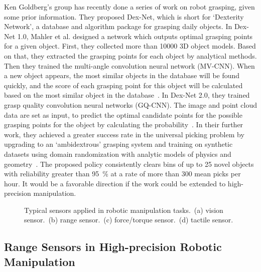 \documentclass[journal,twoside,web]{ieeecolor}
\begin{document}
Ken Goldberg's group has recently done a series of work on robot grasping, given some prior information. 
They proposed Dex-Net, which is short for `Dexterity Network', a database and algorithm package for grasping daily objects.
In Dex-Net 1.0, Mahler et al. designed a network which outputs optimal grasping points for a given object. 
First, they collected more than 10000 3D object models. Based on that, they extracted the grasping points for each object by analytical methods. Then they trained the multi-angle convolution neural network (MV-CNN). When a new object appears, the most similar objects in the database will be found quickly, and the score of each grasping point for this object will be calculated based on the most similar object in the database~\cite{Mahler2016}.
In Dex-Net 2.0, they trained grasp quality convolution neural networks (GQ-CNN). The image and point cloud data are set as input, to predict the optimal candidate points for the possible grasping points for the object by calculating the probability~\cite{Mahler2017a}.
In their further work, they achieved a greater success rate in the universal picking problem by upgrading to an `ambidextrous' grasping system and training on synthetic datasets using domain randomization with analytic models of physics and geometry~\cite{Mahler2018,Mahler2019}. The proposed policy consistently clears bins of up to 25 novel objects with reliability greater than \SI{95}{\percent} at a rate of more than 300 mean picks per hour. It would be a favorable direction if the work could be extended to high-precision manipulation.

\begin{figure}
    \centering
    {
        \hfil
        \hfil
        \hfil		
    }
    \caption{Typical sensors applied in robotic manipulation tasks.~(a) vision sensor.~(b) range sensor.~(c) force/torque sensor.~(d) tactile sensor.}
    \label{fig:sensors}
\end{figure}

\subsection{Range Sensors in High-precision Robotic Manipulation}
\label{subsec:range_sensor}
\end{document}
